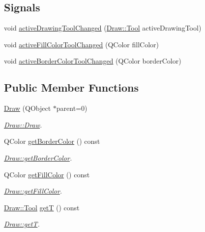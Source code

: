 \subsection*{Signals}
\begin{DoxyCompactItemize}
\item 
void \hyperlink{class_draw_a65056d377baf1383f8af678ba2ed1467}{active\+Drawing\+Tool\+Changed} (\hyperlink{class_draw_aef97a848de7a634c35c3ce678be88b9b}{Draw\+::\+Tool} active\+Drawing\+Tool)
\item 
void \hyperlink{class_draw_ac28b7e408c687ddfd85e01954109329d}{active\+Fill\+Color\+Tool\+Changed} (Q\+Color fill\+Color)
\item 
void \hyperlink{class_draw_aeafc6ac98a670e97b047bc34d7a13141}{active\+Border\+Color\+Tool\+Changed} (Q\+Color border\+Color)
\end{DoxyCompactItemize}
\subsection*{Public Member Functions}
\begin{DoxyCompactItemize}
\item 
\hyperlink{class_draw_aaad70829cedc40ada59d620bf075e27d}{Draw} (Q\+Object $\ast$parent=0)
\begin{DoxyCompactList}\small\item\em \hyperlink{class_draw_aaad70829cedc40ada59d620bf075e27d}{Draw\+::\+Draw}. \end{DoxyCompactList}\item 
Q\+Color \hyperlink{class_draw_aa3700cc975270d70dcf18d4160d7f1e6}{get\+Border\+Color} () const
\begin{DoxyCompactList}\small\item\em \hyperlink{class_draw_aa3700cc975270d70dcf18d4160d7f1e6}{Draw\+::get\+Border\+Color}. \end{DoxyCompactList}\item 
Q\+Color \hyperlink{class_draw_a4be8a242b92fd9d5c42fe9a40810cdb6}{get\+Fill\+Color} () const
\begin{DoxyCompactList}\small\item\em \hyperlink{class_draw_a4be8a242b92fd9d5c42fe9a40810cdb6}{Draw\+::get\+Fill\+Color}. \end{DoxyCompactList}\item 
\hyperlink{class_draw_aef97a848de7a634c35c3ce678be88b9b}{Draw\+::\+Tool} \hyperlink{class_draw_a051a72609a03e7b21990060d0f306558}{getT} () const
\begin{DoxyCompactList}\small\item\em \hyperlink{class_draw_a051a72609a03e7b21990060d0f306558}{Draw\+::getT}. \end{DoxyCompactList}\end{DoxyCompactItemize}


